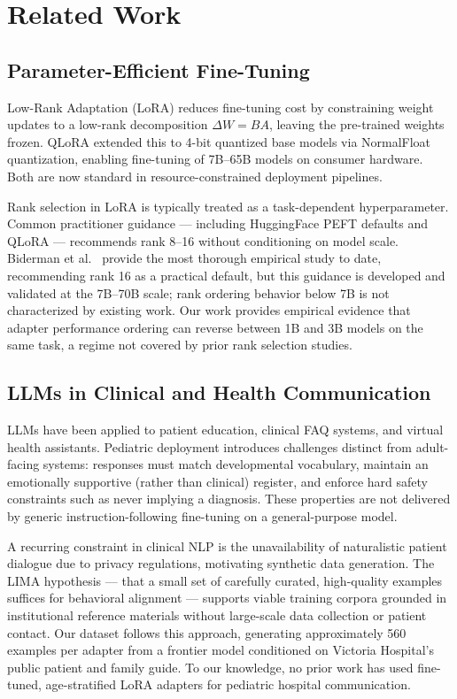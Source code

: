 \documentclass[AMA,Times1COL]{WileyNJDv5} %
\begin{document}
\section{Related Work}\label{sec2}

\subsection{Parameter-Efficient Fine-Tuning}

Low-Rank Adaptation (LoRA) \cite{hu2022lora} reduces fine-tuning cost by constraining weight updates to a low-rank decomposition $\Delta W = BA$, leaving the pre-trained weights frozen. QLoRA \cite{dettmers2023qlora} extended this to 4-bit quantized base models via NormalFloat quantization, enabling fine-tuning of 7B--65B models on consumer hardware. Both are now standard in resource-constrained deployment pipelines.

Rank selection in LoRA is typically treated as a task-dependent hyperparameter. Common practitioner guidance --- including HuggingFace PEFT defaults and QLoRA \cite{dettmers2023qlora} --- recommends rank 8--16 without conditioning on model scale. Biderman et al.~\cite{biderman2024lora} provide the most thorough empirical study to date, recommending rank 16 as a practical default, but this guidance is developed and validated at the 7B--70B scale; rank ordering behavior below 7B is not characterized by existing work. Our work provides empirical evidence that adapter performance ordering can reverse between 1B and 3B models on the same task, a regime not covered by prior rank selection studies.

\subsection{LLMs in Clinical and Health Communication}

LLMs have been applied to patient education, clinical FAQ systems, and virtual health assistants. Pediatric deployment introduces challenges distinct from adult-facing systems: responses must match developmental vocabulary, maintain an emotionally supportive (rather than clinical) register, and enforce hard safety constraints such as never implying a diagnosis. These properties are not delivered by generic instruction-following fine-tuning on a general-purpose model.

A recurring constraint in clinical NLP is the unavailability of naturalistic patient dialogue due to privacy regulations, motivating synthetic data generation. The LIMA hypothesis \cite{zhou2023lima} --- that a small set of carefully curated, high-quality examples suffices for behavioral alignment --- supports viable training corpora grounded in institutional reference materials without large-scale data collection or patient contact. Our dataset follows this approach, generating approximately 560 examples per adapter from a frontier model conditioned on Victoria Hospital's public patient and family guide. To our knowledge, no prior work has used fine-tuned, age-stratified LoRA adapters for pediatric hospital communication.
\end{document}

